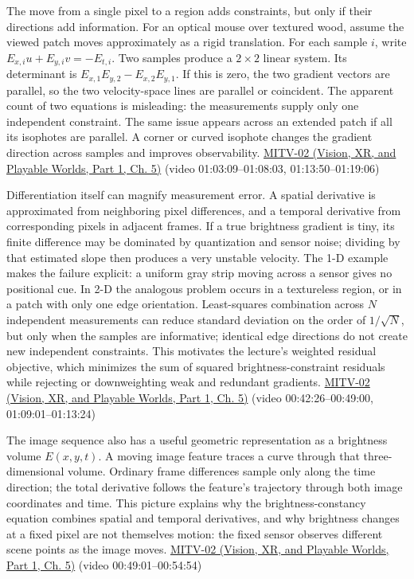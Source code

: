 The move from a single pixel to a region adds constraints, but only if their directions add information. For an optical mouse over textured wood, assume the viewed patch moves approximately as a rigid translation. For each sample \(i\), write \(E_{x,i}u+E_{y,i}v=-E_{t,i}\). Two samples produce a \(2\times2\) linear system. Its determinant is \(E_{x,1}E_{y,2}-E_{x,2}E_{y,1}\). If this is zero, the two gradient vectors are parallel, so the two velocity-space lines are parallel or coincident. The apparent count of two equations is misleading: the measurements supply only one independent constraint. The same issue appears across an extended patch if all its isophotes are parallel. A corner or curved isophote changes the gradient direction across samples and improves observability. \href{../07-Vision-XR-and-Playable-Worlds-P01/main.pdf\#nameddest=04-visual-computing-ii-ch036-mitv-02---image-formation-perspective-projection-time-derivative-motion-field}{MITV-02 (Vision, XR, and Playable Worlds, Part 1, Ch. 5)} (video 01:03:09--01:08:03, 01:13:50--01:19:06)

Differentiation itself can magnify measurement error. A spatial derivative is approximated from neighboring pixel differences, and a temporal derivative from corresponding pixels in adjacent frames. If a true brightness gradient is tiny, its finite difference may be dominated by quantization and sensor noise; dividing by that estimated slope then produces a very unstable velocity. The 1-D example makes the failure explicit: a uniform gray strip moving across a sensor gives no positional cue. In 2-D the analogous problem occurs in a textureless region, or in a patch with only one edge orientation. Least-squares combination across \(N\) independent measurements can reduce standard deviation on the order of \(1/\sqrt{N}\), but only when the samples are informative; identical edge directions do not create new independent constraints. This motivates the lecture's weighted residual objective, which minimizes the sum of squared brightness-constraint residuals while rejecting or downweighting weak and redundant gradients. \href{../07-Vision-XR-and-Playable-Worlds-P01/main.pdf\#nameddest=04-visual-computing-ii-ch036-mitv-02---image-formation-perspective-projection-time-derivative-motion-field}{MITV-02 (Vision, XR, and Playable Worlds, Part 1, Ch. 5)} (video 00:42:26--00:49:00, 01:09:01--01:13:24)

The image sequence also has a useful geometric representation as a brightness volume \(E(x,y,t)\). A moving image feature traces a curve through that three-dimensional volume. Ordinary frame differences sample only along the time direction; the total derivative follows the feature's trajectory through both image coordinates and time. This picture explains why the brightness-constancy equation combines spatial and temporal derivatives, and why brightness changes at a fixed pixel are not themselves motion: the fixed sensor observes different scene points as the image moves. \href{../07-Vision-XR-and-Playable-Worlds-P01/main.pdf\#nameddest=04-visual-computing-ii-ch036-mitv-02---image-formation-perspective-projection-time-derivative-motion-field}{MITV-02 (Vision, XR, and Playable Worlds, Part 1, Ch. 5)} (video 00:49:01--00:54:54)

